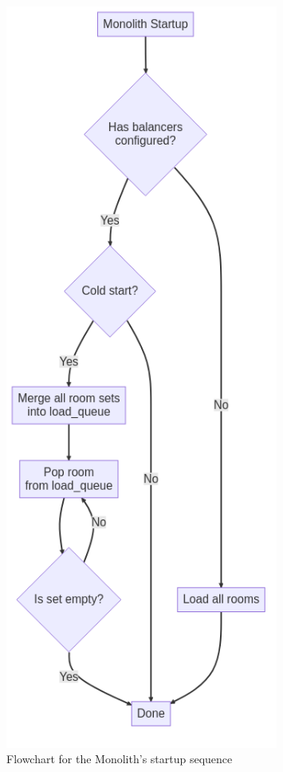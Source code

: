 \begin{figure}[!h]
  \centering
  \includegraphics[width=0.8\textwidth]{Figures/monolith-startup.png}
  \caption{Flowchart for the Monolith's startup sequence}
  \label{Figure::monolith-startup}
\end{figure}

